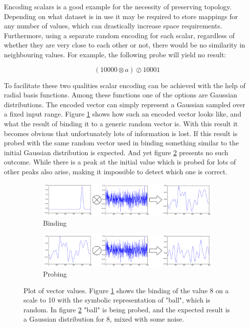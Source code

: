 \documentclass[conference]{IEEEtran}
\begin{document}
	Encoding scalars is a good example for the necessity of preserving topology.
Depending on what dataset is in use it may be required to store mappings for any number of values, which can drastically increase space requirements.
Furthermore, using a separate random encoding for each scalar, regardless of whether they are very close to each other or not, there would be no similarity in neighbouring values.
For example, the following probe will yield no result:
	
	\begin{equation}
	(10000 \otimes a) \oslash 10001
	\end{equation}
	
	To facilitate these two qualities scalar encoding can be achieved with the help of radial basis functions. Among these functions one of the options are Gaussian distributions.
The encoded vector can simply represent a Gaussian sampled over a fixed input range.
Figure \ref{no-perm-a} shows how such an encoded vector looks like, and what the result of binding it to a generic random vector is.
With this result it becomes obvious that unfortunately lots of information is lost.
If this result is probed with the same random vector used in binding something similar to the initial Gaussian distribution is expected.
And yet figure \ref{no-perm-b} presents no such outcome.
While there is a peak at the initial value which is probed for lots of other peaks also arise, making it impossible to detect which one is correct.

	
	\begin{figure}[th!]
		\begin{subfigure}{1\columnwidth}
			\includegraphics[width=\columnwidth]{img/scalar-pre-perm.png}
			\caption{Binding}
			\label{no-perm-a}
		\end{subfigure}
		\begin{subfigure}{1\columnwidth}
			\includegraphics[width=\columnwidth]{img/scalar-pre-perm-probe.png}
			\caption{Probing}
			\label{no-perm-b}
		\end{subfigure}
		\caption{Plot of vector values.
Figure \ref{no-perm-a} shows the binding of the value 8 on a scale to 10 with the symbolic representation of "ball", which is random.
In figure \ref{no-perm-b} "ball" is being probed, and the expected result is a Gaussian distribution for 8, mixed with some noise.}
		\label{no-perm}
	\end{figure}
	
\end{document}

